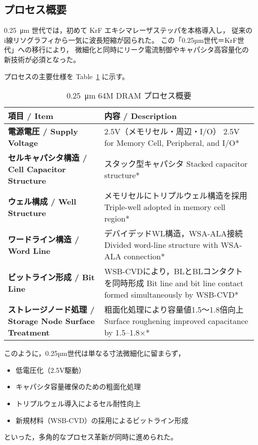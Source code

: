 \documentclass[conference]{IEEEtran}
\let\meter\metre
\begin{document}
\subsection{プロセス概要}
\SI{0.25}{\micro\meter} 世代では，初めて KrF エキシマレーザステッパを本格導入し，
従来の i線リソグラフィから一気に波長短縮が図られた。
この「0.25µm世代＝KrF世代」への移行により，
微細化と同時にリーク電流制御やキャパシタ高容量化の新技術が必須となった。

プロセスの主要仕様を Table~\ref{tab:process25} に示す。

\begin{table}[h]
\centering
\caption{\SI{0.25}{\micro\meter} 64M DRAM プロセス概要}
\label{tab:process25}
\begin{tabular}{|p{3.2cm}|p{4.8cm}|}
\hline
\textbf{項目 / Item} & \textbf{内容 / Description} \\
\hline
\textbf{電源電圧 / Supply Voltage} & 2.5V（メモリセル・周辺・I/O） \newline *2.5V for Memory Cell, Peripheral, and I/O* \\
\hline
\textbf{セルキャパシタ構造 / Cell Capacitor Structure} & スタック型キャパシタ \newline *Stacked capacitor structure* \\
\hline
\textbf{ウェル構成 / Well Structure} & メモリセルにトリプルウェル構造を採用 \newline *Triple-well adopted in memory cell region* \\
\hline
\textbf{ワードライン構造 / Word Line} & デバイデッドWL構造，WSA-ALA接続 \newline *Divided word-line structure with WSA-ALA connection* \\
\hline
\textbf{ビットライン形成 / Bit Line} & WSB-CVDにより，BLとBLコンタクトを同時形成 \newline *Bit line and bit line contact formed simultaneously by WSB-CVD* \\
\hline
\textbf{ストレージノード処理 / Storage Node Surface Treatment} & 粗面化処理により容量値1.5～1.8倍向上 \newline *Surface roughening improved capacitance by 1.5–1.8×* \\
\hline
\end{tabular}
\end{table}

\noindent
このように，0.25µm世代は単なる寸法微細化に留まらず，
\begin{itemize}
  \item 低電圧化（2.5V駆動）
  \item キャパシタ容量確保のための粗面化処理
  \item トリプルウェル導入によるセル耐性向上
  \item 新規材料（WSB-CVD）の採用によるビットライン形成
\end{itemize}
といった，多角的なプロセス革新が同時に進められた。
\end{document}
